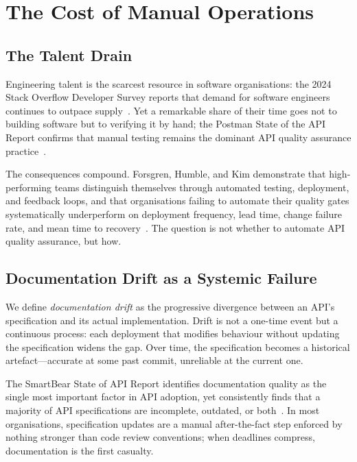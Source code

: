 \section{The Cost of Manual Operations}
\label{sec:cost-manual}

\subsection{The Talent Drain}
\label{subsec:talent-drain}

Engineering talent is the scarcest resource in software organisations: the 2024 Stack Overflow Developer Survey reports that demand for software engineers continues to outpace supply~\cite{stackoverflow-survey}. Yet a remarkable share of their time goes not to building software but to verifying it by hand; the Postman State of the API Report confirms that manual testing remains the dominant API quality assurance practice~\cite{postman-state-of-api}.

The consequences compound. Forsgren, Humble, and Kim demonstrate that high-performing teams distinguish themselves through automated testing, deployment, and feedback loops, and that organisations failing to automate their quality gates systematically underperform on deployment frequency, lead time, change failure rate, and mean time to recovery~\cite{accelerate}. The question is not whether to automate API quality assurance, but how.

\subsection{Documentation Drift as a Systemic Failure}
\label{subsec:doc-drift}

We define \textit{documentation drift} as the progressive divergence between an API's specification and its actual implementation. Drift is not a one-time event but a continuous process: each deployment that modifies behaviour without updating the specification widens the gap. Over time, the specification becomes a historical artefact---accurate at some past commit, unreliable at the current one.

The SmartBear State of API Report identifies documentation quality as the single most important factor in API adoption, yet consistently finds that a majority of API specifications are incomplete, outdated, or both~\cite{smartbear-api-report}. In most organisations, specification updates are a manual after-the-fact step enforced by nothing stronger than code review conventions; when deadlines compress, documentation is the first casualty.


